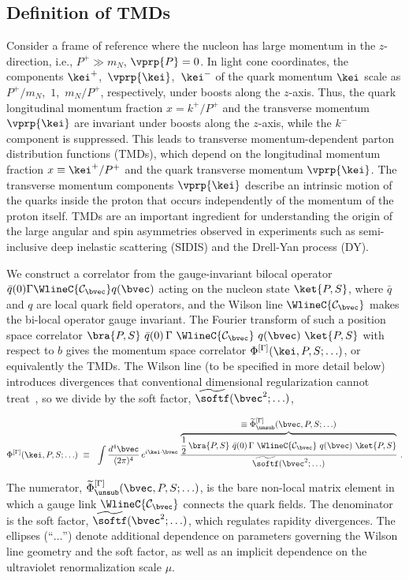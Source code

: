 \subsection{Definition of TMDs}
\label{sec:tmd_definition}
Consider a frame of reference where the nucleon has large momentum in the $z$-direction, i.e., $P^+ \gg m_N$, $\vprp{P} = 0$.
In light cone coordinates, the components $\kei^+$,~$\vprp{\kei}$,~$\kei^-$ of the quark momentum $\kei$ scale as $P^+/m_N$,~$1$,~$m_N/P^+$, respectively, under boosts along the $z$-axis. Thus, the quark longitudinal momentum fraction $x = k^+ / P^+$ and the transverse momentum $\vprp{\kei}$ are invariant under boosts along the $z$-axis, while the $k^-$ component is suppressed. 
This leads to transverse momentum-dependent parton distribution functions (TMDs), which depend on the longitudinal momentum fraction $x \equiv \kei^+ / P^+$ and the quark transverse momentum $\vprp{\kei}$. 
The transverse momentum components $\vprp{\kei}$ describe an intrinsic motion of the quarks inside the proton that occurs independently of the momentum of the proton itself. TMDs are an important ingredient for understanding the origin of the large angular and spin asymmetries observed in experiments such as semi-inclusive deep inelastic scattering (SIDIS) and the Drell-Yan process (DY).

We construct a correlator from the gauge-invariant bilocal operator $\bar q(0) \Gamma \WlineC{\mathcal{C}_\bvec} q(\bvec)$ acting on the nucleon state $\ket{P, S}$, where $\bar q$ and $q$ are local quark field operators, and the Wilson line $\WlineC{\mathcal{C}_\bvec}$ makes the bi-local operator gauge invariant. The Fourier transform of such a position space correlator $\bra{P,S}\ \bar{q}(0)\, \Gamma\ \WlineC{\mathcal{C}_\bvec}\ q(\bvec)\ \ket{P,S}$ with respect to $b$ gives the momentum space correlator $\Phi^{[\Gamma]}(\kei,P,S;\ldots)$, or equivalently the TMDs. The Wilson
line (to be specified in more detail below) introduces divergences that conventional dimensional
regularization cannot treat~\cite{Musch:2011er}, so we divide by the soft factor, $\widetilde{\softf}(\bvec^2;\ldots)$, 
\begin{widetext}
\begin{align}
	\Phi^{[\Gamma]}(\kei,P,S;\ldots)\ \equiv\ \ 
	\int \frac{d^4 \bvec}{(2\pi)^4}\, e^{i \kei\cdot \bvec}\,
		\frac{\overbrace{\rule{0em}{1.2em}
		\frac{1}{2}\, \bra{P,S}\ \bar{q}(0)\, \Gamma\ \WlineC{\mathcal{C}_\bvec}\ q(\bvec)\ \ket{P,S}
		}^{\displaystyle \equiv \widetilde \Phi_\unsub^{[\Gamma]}(\bvec,P,S;\ldots)}}
		{ \widetilde{\softf}(\bvec^2;\ldots) } \ .
		\label{eq-corr}	
\end{align}
\end{widetext}
The numerator, $\widetilde \Phi_\unsub^{[\Gamma]}(\bvec, P,S;\ldots)$, is the bare non-local matrix element in which a gauge link $\WlineC{\mathcal{C}_\bvec}$ connects the quark fields. The denominator is the soft factor, $\widetilde{\softf}(\bvec^2;\ldots)$, which regulates rapidity divergences. The ellipses (``$\ldots$'') denote additional dependence on parameters governing the Wilson line geometry and the soft factor, as well as an implicit dependence on the ultraviolet renormalization scale $\mu$.

